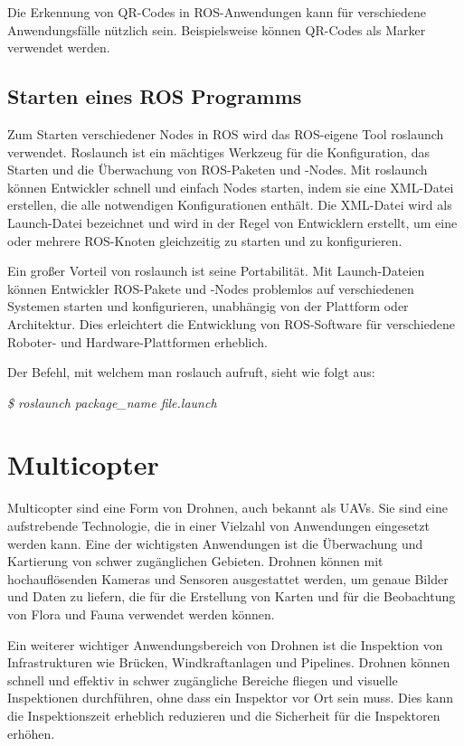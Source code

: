     Die Erkennung von QR-Codes in \ac{ROS}-Anwendungen kann für verschiedene Anwendungsfälle nützlich sein. Beispielsweise können QR-Codes als Marker verwendet werden.

    \subsection{Starten eines ROS Programms} \label{starten eines ROS Programms:subsection}
    Zum Starten verschiedener Nodes in \ac{ROS} wird das ROS-eigene Tool roslaunch verwendet. Roslaunch ist ein mächtiges Werkzeug für die Konfiguration, das Starten und die Überwachung von ROS-Paketen und -Nodes. Mit roslaunch können Entwickler schnell und einfach Nodes starten, indem sie eine XML-Datei erstellen, die alle notwendigen Konfigurationen enthält. Die XML-Datei wird als Launch-Datei bezeichnet und wird in der Regel von Entwicklern erstellt, um eine oder mehrere ROS-Knoten gleichzeitig zu starten und zu konfigurieren.

    Ein großer Vorteil von roslaunch ist seine Portabilität. Mit Launch-Dateien können Entwickler ROS-Pakete und -Nodes problemlos auf verschiedenen Systemen starten und konfigurieren, unabhängig von der Plattform oder Architektur. Dies erleichtert die Entwicklung von ROS-Software für verschiedene Roboter- und Hardware-Plattformen erheblich. \cite{roslaunch}

    Der Befehl, mit welchem man roslauch aufruft, sieht wie folgt aus:
    
    \textit{\$ roslaunch package\_name file.launch}

\section{Multicopter} \label{drohne:section}

Multicopter sind eine Form von Drohnen, auch bekannt als \ac{UAV}s. Sie sind eine aufstrebende Technologie, die in einer Vielzahl von Anwendungen eingesetzt werden kann. Eine der wichtigsten Anwendungen ist die Überwachung und Kartierung von schwer zugänglichen Gebieten. Drohnen können mit hochauflösenden Kameras und Sensoren ausgestattet werden, um genaue Bilder und Daten zu liefern, die für die Erstellung von Karten und für die Beobachtung von Flora und Fauna verwendet werden können.

Ein weiterer wichtiger Anwendungsbereich von Drohnen ist die Inspektion von Infrastrukturen wie Brücken, Windkraftanlagen und Pipelines. Drohnen können schnell und effektiv in schwer zugängliche Bereiche fliegen und visuelle Inspektionen durchführen, ohne dass ein Inspektor vor Ort sein muss. Dies kann die Inspektionszeit erheblich reduzieren und die Sicherheit für die Inspektoren erhöhen.

